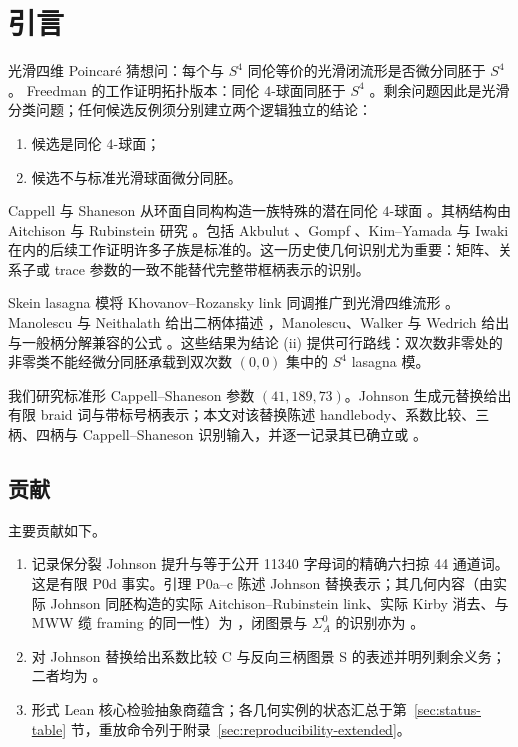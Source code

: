 \section{引言}

光滑四维 Poincaré 猜想问：每个与 $S^4$ 同伦等价的光滑闭流形是否微分同胚于 $S^4$。
Freedman 的工作证明拓扑版本：同伦 $4$-球面同胚于 $S^4$ \cite{Freedman1982}。剩余问题因此是光滑分类问题；任何候选反例须分别建立两个逻辑独立的结论：
\begin{enumerate}
\item 候选是同伦 $4$-球面；
\item 候选不与标准光滑球面微分同胚。
\end{enumerate}

Cappell 与 Shaneson 从环面自同构构造一族特殊的潜在同伦 $4$-球面 \cite{CappellShaneson1976}。其柄结构由 Aitchison 与 Rubinstein 研究 \cite{AitchisonRubinstein1984}。包括 Akbulut \cite{Akbulut2010}、Gompf \cite{Gompf2010}、Kim--Yamada \cite{KimYamada2017} 与 Iwaki \cite{Iwaki2024} 在内的后续工作证明许多子族是标准的。这一历史使几何识别尤为重要：矩阵、关系子或 trace 参数的一致不能替代完整带框柄表示的识别。

Skein lasagna 模将 Khovanov--Rozansky link 同调推广到光滑四维流形 \cite{MorrisonWalkerWedrich2019}。Manolescu 与 Neithalath 给出二柄体描述 \cite{ManolescuNeithalath2020}，Manolescu、Walker 与 Wedrich 给出与一般柄分解兼容的公式 \cite{ManolescuWalkerWedrich2023}。这些结果为结论 (ii) 提供可行路线：双次数非零处的非零类不能经微分同胚承载到双次数 $(0,0)$ 集中的 $S^4$ lasagna 模。

我们研究标准形 Cappell--Shaneson 参数 $(41,189,73)$。Johnson 生成元替换给出有限 braid 词与带标号柄表示；本文对该替换陈述 handlebody、系数比较、三柄、四柄与 Cappell--Shaneson 识别输入，并逐一记录其已确立或 \Open。

\subsection*{贡献}

主要贡献如下。
\begin{enumerate}
\item 记录保分裂 Johnson 提升与等于公开 11340 字母词的精确六扫掠 44 通道词。这是有限 P0d 事实。引理 P0a--c 陈述 Johnson 替换表示；其几何内容（由实际 Johnson 同胚构造的实际 Aitchison--Rubinstein link、实际 Kirby 消去、与 MWW 缆 framing 的同一性）为 \Open，闭图景与 \(\Sigma_A^0\) 的识别亦为 \Open。
\item 对 Johnson 替换给出系数比较 C 与反向三柄图景 S 的表述并明列剩余义务；二者均为 \Open。
\item 形式 Lean 核心检验抽象商蕴含；各几何实例的状态汇总于第~\ref{sec:status-table} 节，重放命令列于附录~\ref{sec:reproducibility-extended}。
\end{enumerate}
